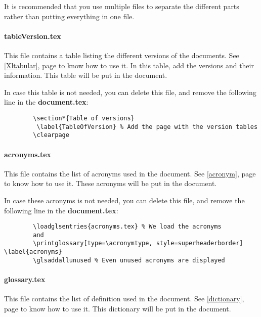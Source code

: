 It is recommended that you use multiple files to separate the different parts rather than putting
everything in one file.

\paragraph{tableVersion.tex}
This file contains a table listing the different versions of the documents. See \ref{Xltabular},
page \pageref{Xltabular} to know how to use it.
In this table, add the versions and their information.
This table will be put in the document.\newline

In case this table is not needed, you can delete this file, and remove the following line in the
\textbf{document.tex}:
\begin{code}
    \begin{verbatim}
        \section*{Table of versions}
         \label{TableOfVersion} % Add the page with the version tables
        \clearpage
    \end{verbatim}
    \caption{Delete versions table}
\end{code}

\paragraph{acronyms.tex}
This file contains the list of acronyms used in the document. See \ref{acronym}, page
\pageref{acronym} to know how to use it.
These acronyms will be put in the document.\newline

In case these acronyms is not needed, you can delete this file, and remove the following line in the
\textbf{document.tex}:
\begin{code}
    \begin{verbatim}
        \loadglsentries{acronyms.tex} % We load the acronyms
        and
        \printglossary[type=\acronymtype, style=superheaderborder] \label{acronyms}
        \glsaddallunused % Even unused acronyms are displayed
    \end{verbatim}
    \caption{Delete acronyms}
\end{code}

\paragraph{glossary.tex}
This file contains the list of definition used in the document. See \ref{dictionary}, page
\pageref{dictionary} to know how to use it.
This dictionary will be put in the document.\newline

